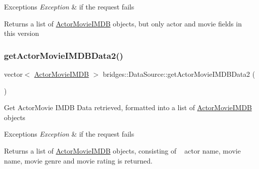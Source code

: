 \begin{DoxyExceptions}{Exceptions}
{\em Exception} & if the request fails\\
\hline
\end{DoxyExceptions}
\begin{DoxyReturn}{Returns}
a list of \mbox{\hyperlink{classbridges_1_1_actor_movie_i_m_d_b}{Actor\+Movie\+I\+M\+DB}} objects, but only actor and movie fields in this version 
\end{DoxyReturn}
\mbox{\label{namespacebridges_1_1_data_source_a022113cbb28042171d088250e85098d0}} 
\subsubsection{\texorpdfstring{get\+Actor\+Movie\+I\+M\+D\+B\+Data2()}{getActorMovieIMDBData2()}}
{\footnotesize\ttfamily vector$<$ \mbox{\hyperlink{classbridges_1_1_actor_movie_i_m_d_b}{Actor\+Movie\+I\+M\+DB}} $>$ bridges\+::\+Data\+Source\+::get\+Actor\+Movie\+I\+M\+D\+B\+Data2 (\begin{DoxyParamCaption}{ }\end{DoxyParamCaption})}

Get Actor\+Movie I\+M\+DB Data retrieved, formatted into a list of \mbox{\hyperlink{classbridges_1_1_actor_movie_i_m_d_b}{Actor\+Movie\+I\+M\+DB}} objects


\begin{DoxyExceptions}{Exceptions}
{\em Exception} & if the request fails\\
\hline
\end{DoxyExceptions}
\begin{DoxyReturn}{Returns}
a list of \mbox{\hyperlink{classbridges_1_1_actor_movie_i_m_d_b}{Actor\+Movie\+I\+M\+DB}} objects, consisting of ~\newline
actor name, movie name, movie genre and movie rating is returned. 
\end{DoxyReturn}
\mbox{\label{namespacebridges_1_1_data_source_a4f8990ea0e793a6464d95cb82f57c8f9}} 
